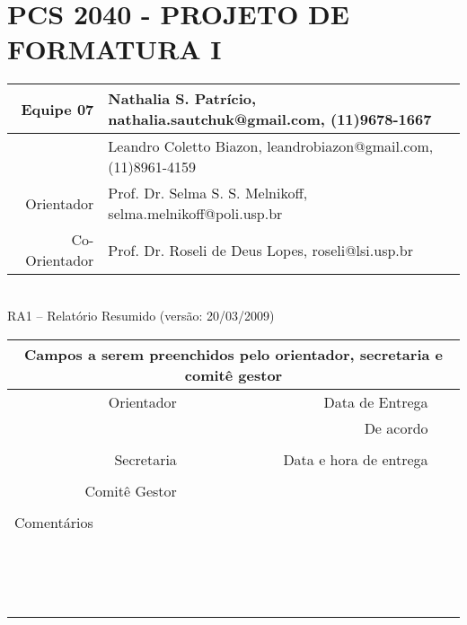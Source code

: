 \documentclass[a4paper,12pt,font=plain,header=plain]{abnt}
\begin{document}
  \setcounter{secnumdepth}{-1}
  \capa

  \renewenvironment{center}{}{}
	\section{PCS 2040 - PROJETO DE FORMATURA I}
 
		\begin{tabular}[|l|]{ |r|l| }
		\hline
			Equipe 07 & Nathalia S. Patrício, nathalia.sautchuk@gmail.com, (11)9678-1667 \\
		\hline
			& Leandro Coletto Biazon, leandrobiazon@gmail.com, (11)8961-4159 \\
		\hline
			Orientador & Prof. Dr. Selma S. S. Melnikoff, selma.melnikoff@poli.usp.br \\
		\hline
			Co-Orientador & Prof. Dr. Roseli de Deus Lopes, roseli@lsi.usp.br \\
		\hline
		\end{tabular} \\
		
		RA1 – Relatório Resumido (versão: 20/03/2009) \\
		
		\begin{tabular}{ |r|r|r| }
	
		\hline
			\multicolumn{3}{|c|}{Campos a serem preenchidos pelo orientador, secretaria e comitê gestor} \\
		\hline
			Orientador & Data de Entrega &  \\
		\hline
			& De acordo &  \\
		\hline
			& &  \\
		\hline
			Secretaria & Data e hora de entrega &  \\
		\hline
			&  &  \\
		\hline
			Comitê Gestor &  &  \\
		\hline
			&  &  \\
		\hline
			\multicolumn{3}{|l|}{Comentários} \\
			\multicolumn{3}{|l|}{} \\
			\multicolumn{3}{|l|}{} \\
			\multicolumn{3}{|l|}{} \\
			\multicolumn{3}{|l|}{} \\
			\multicolumn{3}{|l|}{} \\
			\multicolumn{3}{|l|}{} \\
			\multicolumn{3}{|l|}{} \\
			\multicolumn{3}{|l|}{} \\
			\multicolumn{3}{|l|}{} \\
			\multicolumn{3}{|l|}{} \\
			\multicolumn{3}{|l|}{} \\
			\multicolumn{3}{|l|}{} \\
			\multicolumn{3}{|l|}{} \\
			\multicolumn{3}{|l|}{} \\
			\multicolumn{3}{|l|}{} \\
		\hline
		\end{tabular}
\end{document}
